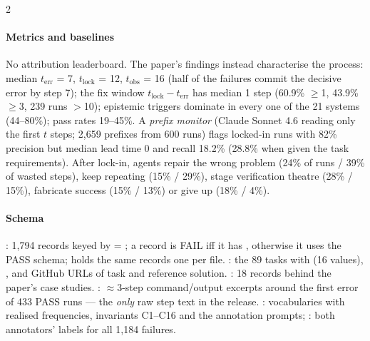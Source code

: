 \begin{multicols}{2}
\paragraph{Metrics and baselines} No attribution leaderboard. The paper's findings instead characterise the process: median $t_{\mathrm{err}}$ = 7, $t_{\mathrm{lock}}$ = 12, $t_{\mathrm{obs}}$ = 16 (half of the failures commit the decisive error by step 7); the fix window $t_{\mathrm{lock}}-t_{\mathrm{err}}$ has median 1 step (60.9\% $\ge$1, 43.9\% $\ge$3, 239 runs $>$10); epistemic triggers dominate in every one of the 21 systems (44--80\%); pass rates 19--45\%. A \emph{prefix monitor} (Claude Sonnet 4.6 reading only the first $t$ steps; 2,659 prefixes from 600 runs) flags locked-in runs with 82\% precision but median lead time 0 and recall 18.2\% (28.8\% when given the task requirements). After lock-in, agents repair the wrong problem (24\% of runs / 39\% of wasted steps), keep repeating (15\% / 29\%), stage verification theatre (28\% / 15\%), fabricate success (15\% / 13\%) or give up (18\% / 4\%).

\paragraph{Schema} : 1,794 records keyed by  = ; a record is FAIL iff it has , otherwise it uses the PASS schema;  holds the same records one per file. : the 89 tasks with  (16 values), ,  and GitHub URLs of task and reference solution. : 18 records behind the paper's case studies. : $\approx$3-step command/output excerpts around the first error of 433 PASS runs --- the \emph{only} raw step text in the release. : vocabularies with realised frequencies, invariants C1--C16 and the annotation prompts; : both annotators' labels for all 1,184 failures.
\end{multicols}

